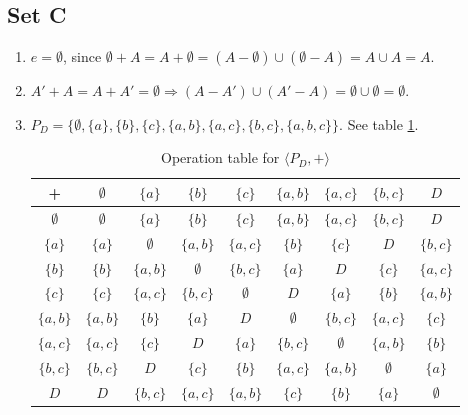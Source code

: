 \subsection{Set C}
\begin{enumerate}
    \item $e = \emptyset$, since $\emptyset + A = A + \emptyset = (A - \emptyset) \cup (\emptyset - A) = A \cup A = A$.
    \item $A' + A = A + A' = \emptyset \Rightarrow (A - A') \cup (A'- A) = \emptyset \cup \emptyset = \emptyset$.
    \item $P_D = \{\emptyset, \{a\}, \{b\}, \{c\}, \{a, b\}, \{a, c\}, \{b, c\}, \{a, b, c\}\}$. See table \ref{tab:powerset-op}.
    \begin{table}[!ht]
        \centering
        \begin{tabular}{c|cccccccc}
        +             & $\emptyset$   & $\{a\}$       & $\{b\}$       & $\{c\}$       & $\{a, b\}$    & $\{a, c\}$    & $\{b, c\}$    & $D$ \\
        \hline
        $\emptyset$   & $\emptyset$   & $\{a\}$       & $\{b\}$       & $\{c\}$       & $\{a, b\}$    & $\{a, c\}$    & $\{b, c\}$    & $D$ \\
        $\{a\}$       & $\{a\}$       & $\emptyset$   & $\{a, b\}$    & $\{a, c\}$    & $\{b\}$       & $\{c\}$       & $D$           & $\{b, c\}$    \\
        $\{b\}$       & $\{b\}$       & $\{a, b\}$    & $\emptyset$   & $\{b, c\}$    & $\{a\}$       & $D$           & $\{c\}$       & $\{a, c\}$    \\
        $\{c\}$       & $\{c\}$       & $\{a, c\}$    & $\{b, c\}$    & $\emptyset$   & $D$           & $\{a\}$       & $\{b\}$       & $\{a, b\}$    \\
        $\{a, b\}$    & $\{a, b\}$    & $\{b\}$       & $\{a\}$       & $D$           & $\emptyset$   & $\{b, c\}$    & $\{a, c\}$    & $\{c\}$       \\
        $\{a, c\}$    & $\{a, c\}$    & $\{c\}$       & $D$           & $\{a\}$       & $\{b, c\}$    & $\emptyset$   & $\{a, b\}$    & $\{b\}$       \\
        $\{b, c\}$    & $\{b, c\}$    & $D$           & $\{c\}$       & $\{b\}$       & $\{a, c\}$    & $\{a, b\}$    & $\emptyset$   & $\{a\}$       \\
        $D$           & $D$           & $\{b, c\}$    & $\{a, c\}$    & $\{a, b\}$    & $\{c\}$       & $\{b\}$       & $\{a\}$       & $\emptyset$  
        \end{tabular}
        \caption{Operation table for $\langle P_D, + \rangle$}
        \label{tab:powerset-op}
    \end{table}
\end{enumerate}

